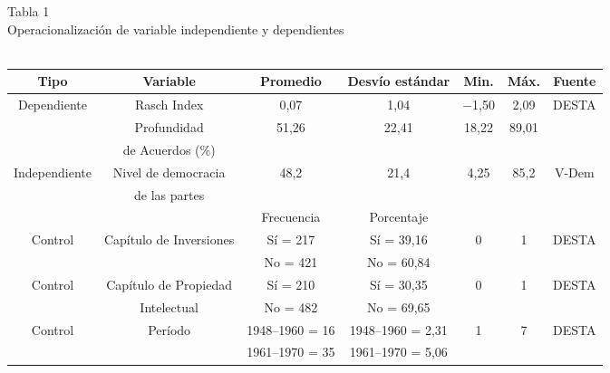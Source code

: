 \documentclass[a4paper]{tufte-handout}
\begin{document}

\begin{table}[h]
  \centering
  \selectfont
   \smallskip\noindent\small Tabla 1 \\ Operacionalización de variable independiente y dependientes \\~\\
  \begin{tabular}{c c c c c c c}
    \toprule
    Tipo & Variable & Promedio & Desvío estándar & Min. & Máx. & Fuente \\
    \midrule
    \multirow{3}{*}{Dependiente} & Rasch Index & 0,07 & 1,04 & $-$1,50 & 2,09 & \multirow{3}{*}{DESTA} \\ 
     & Profundidad & \multirow{2}{*}{51,26} & \multirow{2}{*}{22,41} & \multirow{2}{*}{18,22} & \multirow{2}{*}{89,01} & \\ 
     & de Acuerdos (\%) & & & & & \\ \midrule
    \multirow{2}{*}{Independiente} & Nivel de democracia & \multirow{2}{*}{48,2} & \multirow{2}{*}{21,4} & \multirow{2}{*}{4,25} & \multirow{2}{*}{85,2} & \multirow{2}{*}{V-Dem} \\
    & de las partes & & & & & \\ \midrule
    & & Frecuencia	& Porcentaje & & & \\ \midrule
    \multirow{2}{*}{Control} & \multirow{2}{*}{Capítulo de Inversiones} & Sí = 217 & Sí = 39,16 & \multirow{2}{*}{0} & \multirow{2}{*}{1} & \multirow{2}{*}{DESTA} \\ 
    & & No = 421 & No = 60,84 & & & \\ \midrule
    \multirow{2}{*}{Control} & Capítulo de Propiedad & Sí = 210 & Sí = 30,35 & \multirow{2}{*}{0} & \multirow{2}{*}{1} & \multirow{2}{*}{DESTA} \\ 
    & Intelectual & No = 482 & No = 69,65 & & & \\ \midrule
    \multirow{7}{*}{Control} & \multirow{7}{*}{Período} & 1948--1960 = 16 & 1948--1960 = 2,31 & \multirow{7}{*}{1} & \multirow{7}{*}{7} & \multirow{7}{*}{DESTA} \\
    & & 1961--1970 = 35 & 1961--1970 = 5,06 & & & \\ 

\end{tabular}
\end{table}
\end{document}
